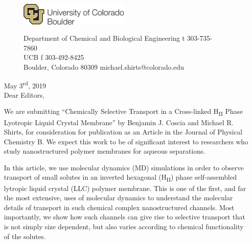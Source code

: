 \documentclass[fontsize=11pt]{article}
\begin{document}
	\graphicspath{{./figures/}}

	\begin{figure}
	\centering
	\begin{minipage}{0.37\textwidth}
	\includegraphics[width=2.14in,left]{CUBoulder.pdf}
	\end{minipage}
	\begin{minipage}{0.62\textwidth}
	\scriptsize
	\noindent Department of Chemical and Biological Engineering \hfill t 303-735-7860~~~~~~~~~~~~~~~~~~ \\
	 UCB \hfill f 303-492-8425~~~~~~~~~~~~~~~~~~ \\
	\noindent Boulder, Colorado 80309 \hfill michael.shirts@colorado.edu \\
	\end{minipage}
	\end{figure}
	
	\noindent May 3\textsuperscript{rd}, 2019\\

	\noindent Dear Editors,\\
	
	\newcommand{\ManuscriptTitle}{Chemically Selective Transport in a Cross-linked 
	H\textsubscript{II} Phase Lyotropic Liquid Crystal Membrane}
	
	We are submitting ``\ManuscriptTitle'' by Benjamin J. Coscia and Michael R. Shirts, for
	consideration for publication as an Article in the Journal of Physical Chemistry
	B. We expect this work to be of significant interest to researchers who study 
	nanostructured polymer membranes for aqueous separations.
	
	In this article, we use molecular dynamics (MD) simulations in
        order to observe transport of small solutes in an inverted
        hexagonal (H\textsubscript{II}) phase self-assembled lytropic
        liquid crystal (LLC) polymer membrane. This is one of the
        first, and far the most extensive, uses of molecular dynamics
        to understand the molecular details of transport in such
        chemical complex nanostructured channels. Most importantly, we
        show how such channels can give rise to selective transport
        that is not simply size dependent, but also varies according
        to chemical functionality of the solutes.
\end{document}
